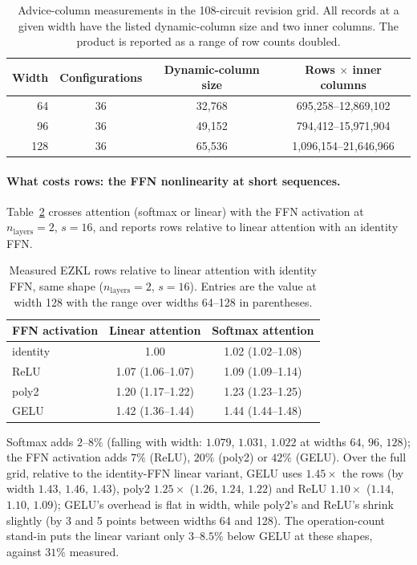 \documentclass[10pt]{article}
\newcommand{\nlayers}{n_{\mathrm{layers}}}
\begin{document}
\begin{table}[t]
\centering
\caption{Advice-column measurements in the 108-circuit revision grid. All
  records at a given width have the listed dynamic-column size and two inner
  columns. The product is reported as a range of row counts doubled.}
\label{tab:columns}
\begin{tabular}{rccc}
\toprule
Width & Configurations & Dynamic-column size & Rows $\times$ inner columns \\
\midrule
64  & 36 & 32,768 & 695,258--12,869,102 \\
96  & 36 & 49,152 & 794,412--15,971,904 \\
128 & 36 & 65,536 & 1,096,154--21,646,966 \\
\bottomrule
\end{tabular}
\end{table}

\paragraph{What costs rows: the FFN nonlinearity at short sequences.}
Table~\ref{tab:decomp} crosses attention (softmax or linear) with the FFN
activation at $\nlayers{=}2$, $s{=}16$, and reports rows relative to linear
attention with an identity FFN.

\begin{table}[t]
\centering
\caption{Measured EZKL rows relative to linear attention with identity FFN,
  same shape ($\nlayers{=}2$, $s{=}16$). Entries are the value at width 128 with
  the range over widths 64--128 in parentheses.}
\label{tab:decomp}
\begin{tabular}{lcc}
\toprule
FFN activation & Linear attention & Softmax attention \\
\midrule
identity & 1.00 & 1.02 (1.02--1.08) \\
ReLU     & 1.07 (1.06--1.07) & 1.09 (1.09--1.14) \\
poly2    & 1.20 (1.17--1.22) & 1.23 (1.23--1.25) \\
GELU     & 1.42 (1.36--1.44) & 1.44 (1.44--1.48) \\
\bottomrule
\end{tabular}
\end{table}

Softmax adds $2$--$8\%$ (falling with width: $1.079$, $1.031$, $1.022$ at widths
$64$, $96$, $128$); the FFN activation adds $7\%$ (ReLU), $20\%$ (poly2) or
$42\%$ (GELU). Over the full grid, relative to the identity-FFN linear variant,
GELU uses $1.45\times$ the rows (by width $1.43$, $1.46$, $1.43$), poly2
$1.25\times$ ($1.26$, $1.24$, $1.22$) and ReLU $1.10\times$ ($1.14$, $1.10$,
$1.09$); GELU's overhead is flat in width, while poly2's and ReLU's shrink slightly
(by 3 and 5 points between widths 64 and 128). The operation-count stand-in puts the linear variant only $3$--$8.5\%$ below
GELU at these shapes, against $31\%$ measured.
\end{document}
